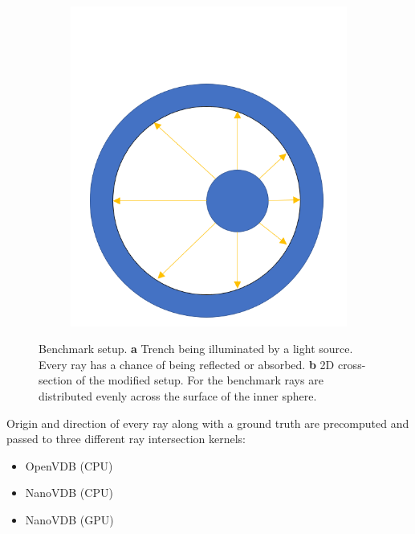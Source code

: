 \begin{figure}[H]
\begin{subfigure}{0.35\textwidth}
\end{subfigure}
	\begin{subfigure}{0.35\textwidth}
	\includegraphics[width=1\linewidth]{res/benchmark_setup.png}
	\caption{}
\end{subfigure}

\caption{Benchmark setup. \textbf{a} Trench being illuminated by a light source. Every ray has a chance of being reflected or absorbed.
\textbf{b} 2D cross-section of the modified setup. For the benchmark rays are distributed evenly across the surface of the inner sphere.} 
\label{fig:benchmark_setup}
\end{figure}


Origin and direction of every ray along with a ground truth are precomputed and passed to three different ray intersection kernels:

\begin{itemize}
	\item OpenVDB (CPU)
	\item NanoVDB (CPU)
	\item NanoVDB (GPU)
\end{itemize}

